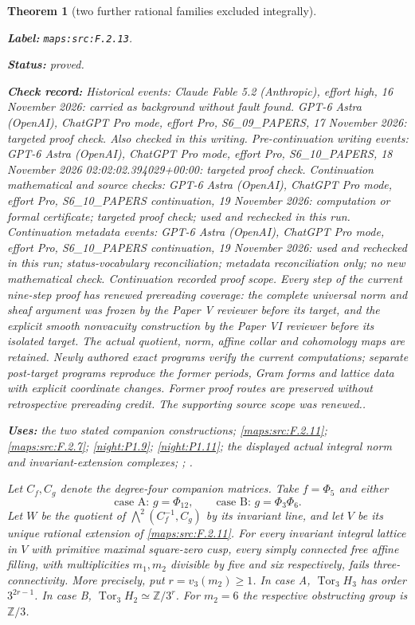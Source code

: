 \documentclass[11pt,a4paper]{article}
\newtheorem{theorem}{Theorem}[section]
\theoremstyle{definition}
\newcommand{\StatementRecord}[4]{\par\smallskip\begingroup\upshape\raggedright\noindent\textbf{Label:} \nolinkurl{#1}.\par\noindent\textbf{Status:} #2.\par\noindent\textbf{Check record:} #3.\par\noindent\textbf{Uses:} #4.\par\endgroup\smallskip}
\begin{document}
\begin{theorem}[two further rational families excluded integrally]\label{maps:src:F.2.13}
\StatementRecord{maps:src:F.2.13}{proved}{Historical events: Claude Fable 5.2 (Anthropic), effort high, 16 November 2026: carried as background without fault found. GPT-6 Astra (OpenAI), ChatGPT Pro mode, effort Pro, S6\_09\_PAPERS, 17 November 2026: targeted proof check. Also checked in this writing. Pre-continuation writing events: GPT-6 Astra (OpenAI), ChatGPT Pro mode, effort Pro, S6\_10\_PAPERS, 18 November 2026 02:02:02.394029+00:00: targeted proof check. Continuation mathematical and source checks: GPT-6 Astra (OpenAI), ChatGPT Pro mode, effort Pro, S6\_10\_PAPERS continuation, 19 November 2026: computation or formal certificate; targeted proof check; used and rechecked in this run. Continuation metadata events: GPT-6 Astra (OpenAI), ChatGPT Pro mode, effort Pro, S6\_10\_PAPERS continuation, 19 November 2026: used and rechecked in this run; status-vocabulary reconciliation; metadata reconciliation only; no new mathematical check. \emph{Continuation recorded proof scope.} Every step of the current nine-step proof has renewed prereading coverage: the complete universal norm and sheaf argument was frozen by the Paper V reviewer before its target, and the explicit smooth nonvacuity construction by the Paper VI reviewer before its isolated target. The actual quotient, norm, affine collar and cohomology maps are retained. Newly authored exact programs verify the current computations; separate post-target programs reproduce the former periods, Gram forms and lattice data with explicit coordinate changes. Former proof routes are preserved without retrospective prereading credit. The supporting source scope was renewed.}{the two stated companion constructions; \cref{maps:src:F.2.11}; \cref{maps:src:F.2.7}; \cref{night:P1.9}; \cref{night:P1.11}; the displayed actual integral norm and invariant-extension complexes; \cite[Tag~09V5, Lemma~20.18.1; Tag~01F2, Lemma~20.13.4]{StacksProject}; \cite[Theorem~3.2, p.~195]{Hatcher2002}}


Let $C_f,C_g$ denote the degree-four companion matrices.
Take $f=\Phi_5$ and either
\[
 \text{case A: }g=\Phi_{12},\qquad
 \text{case B: }g=\Phi_3\Phi_6.
 \tag{F.36}\label{maps:eq:F.36}
\]
Let $W$ be the quotient of
$\bigwedge^2(C_f^{-1},C_g)$ by its invariant line, and
let $V$ be its unique rational extension of \ref{maps:src:F.2.11}.
For every invariant integral lattice in $V$ with primitive
maximal square-zero cusp, every simply connected free affine
filling, with multiplicities $m_1,m_2$ divisible by five and
six respectively, fails three-connectivity.
More precisely, put $r=v_3(m_2)\geq1$.
In case A, $\operatorname{Tor}_3 H_3$ has order
$3^{2r-1}$.  In case B,
$\operatorname{Tor}_3 H_2\simeq\mathbb Z/3^r$.
For $m_2=6$ the respective obstructing group is $\mathbb Z/3$.

\end{theorem}
\end{document}

